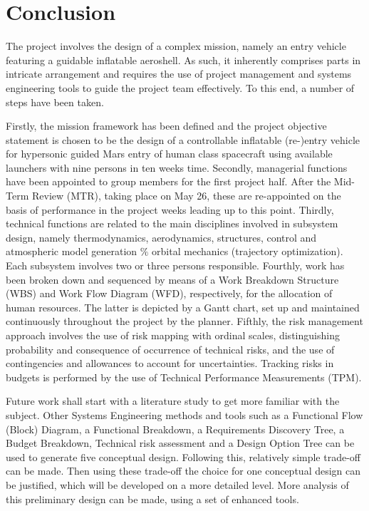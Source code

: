\section{Conclusion}\label{cha:conclusion}
The project involves the design of a complex mission, namely an entry vehicle featuring a guidable inflatable aeroshell. As such, it inherently comprises parts in intricate arrangement and requires the use of project management and systems engineering tools to guide the project team effectively. To this end, a number of steps have been taken. 

Firstly, the mission framework has been defined and the project objective statement is chosen to be the design of a controllable inflatable (re-)entry vehicle for hypersonic guided Mars entry of human class spacecraft using available launchers with nine persons in ten weeks time.  Secondly, managerial functions have been appointed to group members for the first project half. After the Mid-Term Review (MTR), taking place on May 26, these are re-appointed on the basis of performance in the project weeks leading up to this point. Thirdly, technical functions are related to the main disciplines involved in subsystem design, namely thermodynamics, aerodynamics, structures, control and atmospheric model generation $\%$ orbital mechanics (trajectory optimization). Each subsystem involves two or three persons responsible. Fourthly, work has been broken down  and sequenced by means of a Work Breakdown Structure (WBS) and Work Flow Diagram (WFD), respectively, for the allocation of human resources. The latter is depicted by a Gantt chart, set up and maintained continuously throughout the project by the planner. Fifthly, the risk management approach involves the use of risk mapping with ordinal scales, distinguishing probability and consequence of occurrence of technical risks, and the use of contingencies and allowances to account for uncertainties. Tracking risks in budgets is performed by the use of Technical Performance Measurements (TPM).

Future work shall start with a literature study to get more familiar with the subject. Other Systems Engineering methods and tools such as a Functional Flow (Block) Diagram, a Functional Breakdown, a Requirements Discovery Tree, a Budget Breakdown, Technical risk assessment and a Design Option Tree can be used to generate five conceptual design. Following this, relatively simple trade-off can be made. Then using these trade-off the choice for one conceptual design can be justified, which will be developed on a more detailed level. More analysis of this preliminary design can be made, using a set of enhanced tools. 
